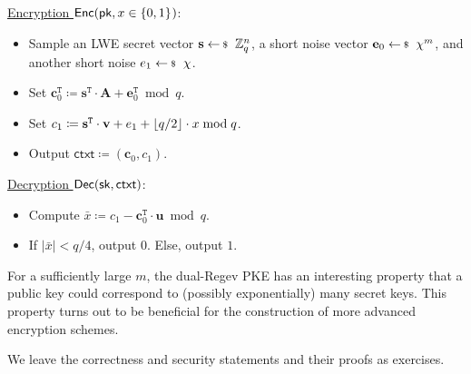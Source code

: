 \documentclass[10pt,twoside]{article}
\newcommand{\ctxt}{\mathsf{ctxt}}
\newcommand{\bits}[1][]{\{0,1\}^{#1}}
\renewcommand{\vec}[1]{\mathbf{#1}}
\newcommand{\mat}[1]{\mathbf{#1}}
\newcommand{\transpose}{\mathtt{T}}
\begin{document}
\noindent\underline{Encryption $\enc(\pk, x \in \bits)$}:
\begin{itemize}
    \item Sample an LWE secret vector $\vec{s} \sample \ZZ_q^n$, a short noise vector $\vec{e}_0 \sample \chi^{m}$, and another short noise $e_1 \sample \chi$.
    \item Set $\vec{c}_0^\transpose \coloneqq \vec{s}^\transpose \cdot \mat{A} + \vec{e}_0^\transpose \bmod q$.
    \item Set $c_1 \coloneqq \vec{s}^\transpose \cdot \vec{v} + e_1 + \floor{q/2} \cdot x \bmod q$.
    \item Output $\ctxt \coloneqq (\vec{c}_0, c_1)$.
\end{itemize}

\noindent\underline{Decryption $\dec(\sk, \ctxt)$}:
\begin{itemize}
    \item Compute $\bar{x} \coloneqq c_1 - \vec{c}_0^\transpose \cdot \vec{u} \bmod q$.
\item If $|\bar{x}| < q/4$, output $0$. Else, output $1$.
\end{itemize}

For a sufficiently large $m$, the dual-Regev PKE has an interesting property that a public key could correspond to (possibly exponentially) many secret keys.
This property turns out to be beneficial for the construction of more advanced encryption schemes.

We leave the correctness and security statements and their proofs as exercises.







\printbibliography
\end{document}
